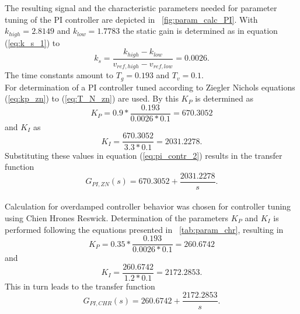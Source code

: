 The resulting signal and the characteristic parameters needed for parameter tuning of the PI controller are depicted in \figurename~\ref{fig:param_calc_PI}. With $k_{high}=2.8149$ and $k_{low}=1.7783$ the static gain is determined as in equation (\ref{eq:k_s_1}) to
\begin{equation}
  k_s = \frac{k_{high}-k_{low}}{v_{ref,high}-v_{ref,low}}= 0.0026.
\label{eq:k_s_2}
\end{equation}
The time constants amount to $T_g=0.193$ and $T_v=0.1$.
\\For determination of a PI controller tuned according to Ziegler Nichols equations (\ref{eq:kp_zn}) to (\ref{eq:T_N_zn}) are used. By this $K_{P}$ is determined as
\begin{equation}
  K_{P} = 0.9*\frac{0.193}{0.0026*0.1}=670.3052
\end{equation}
and $K_I$ as
\begin{equation}
  K_{I}  = \frac{670.3052}{3.3*0.1}=2031.2278.
\end{equation}
Substituting these values in equation (\ref{eq:pi_contr_2}) results in the transfer function
\begin{equation}
  G_{PI,ZN}(s)=670.3052+\frac{2031.2278}{s}.
\end{equation}
\\Calculation for overdamped controller behavior was chosen for controller tuning using Chien Hrones Reswick. Determination of the parameters $K_P$ and $K_I$ is performed following the equations presented in \tablename~\ref{tab:param_chr}, resulting in
\begin{equation}
  K_P = 0.35*\frac{0.193}{0.0026*0.1}=260.6742
\end{equation}
and
\begin{equation}
  K_I = \frac{260.6742}{1.2*0.1}=2172.2853.
\end{equation}
This in turn leads to the transfer function
\begin{equation}
  G_{PI,CHR}(s)=260.6742+\frac{2172.2853}{s}.
\end{equation}
